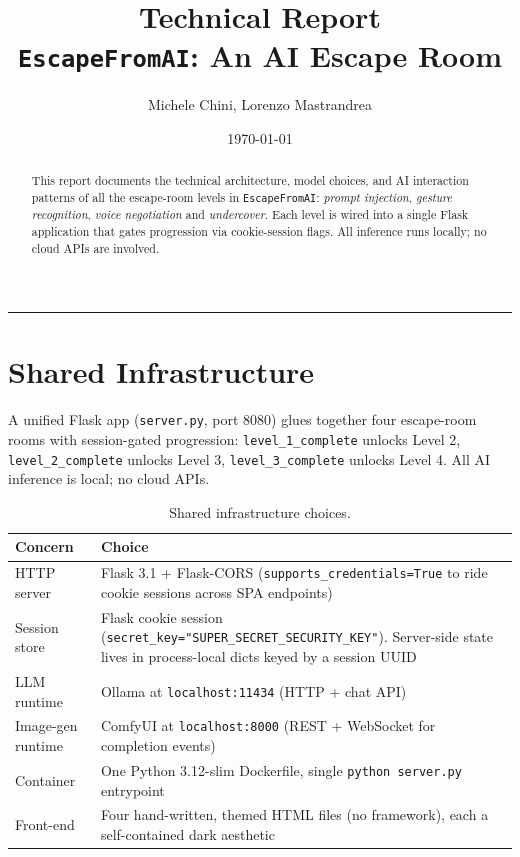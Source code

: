 \documentclass[11pt,a4paper]{article}
\title{\textbf{Technical Report} \\[4pt]
\large \texttt{EscapeFromAI}: An AI Escape Room}
\author{Michele Chini, Lorenzo Mastrandrea}
\date{\today}
\begin{document}
\maketitle

\begin{abstract}
\noindent This report documents the technical architecture, model choices, and AI
interaction patterns of all the escape-room levels in \texttt{EscapeFromAI}:
\emph{prompt injection}, \emph{gesture recognition}, \emph{voice negotiation} and \emph{undercover}.
Each level is wired into a single Flask application that gates progression via
cookie-session flags. All inference runs locally; no cloud APIs are involved.
\end{abstract}

\tableofcontents
\bigskip
\hrule
\bigskip

\section{Shared Infrastructure}

A unified Flask app (\texttt{server.py}, port 8080) glues together four escape-room
rooms with session-gated progression: \texttt{level\_1\_complete} unlocks Level 2,
\texttt{level\_2\_complete} unlocks Level 3, \texttt{level\_3\_complete} unlocks Level 4.
All AI inference is local; no cloud APIs.

\begin{table}[H]
\centering
\small
\renewcommand{\arraystretch}{1.25}
\begin{tabularx}{\linewidth}{l X}
\toprule
\textbf{Concern} & \textbf{Choice} \\
\midrule
HTTP server & Flask 3.1 + Flask-CORS (\texttt{supports\_credentials=True} to ride cookie sessions across SPA endpoints) \\
Session store & Flask cookie session (\texttt{secret\_key="SUPER\_SECRET\_SECURITY\_KEY"}). Server-side state lives in process-local dicts keyed by a session UUID \\
LLM runtime & Ollama at \texttt{localhost:11434} (HTTP + chat API) \\
Image-gen runtime & ComfyUI at \texttt{localhost:8000} (REST + WebSocket for completion events) \\
Container & One Python 3.12-slim Dockerfile, single \texttt{python server.py} entrypoint \\
Front-end & Four hand-written, themed HTML files (no framework), each a self-contained dark aesthetic \\
\bottomrule
\end{tabularx}
\caption{Shared infrastructure choices.}
\end{table}
\end{document}
